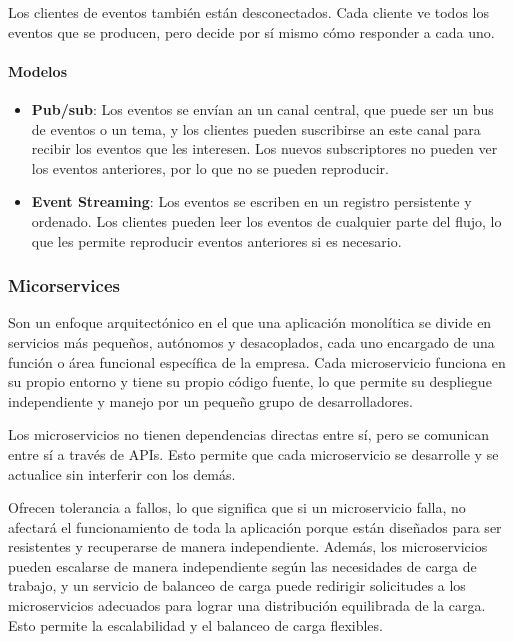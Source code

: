 \documentclass{article}
\begin{document}
		Los clientes de eventos también están desconectados. Cada cliente ve todos los eventos que se producen, pero decide por sí mismo cómo responder a cada uno.
		
		\paragraph{Modelos}
		\begin{itemize}
			\item {\textbf{Pub/sub}}: Los eventos se envían an un canal central, que puede ser un bus de eventos o un tema, y los clientes pueden suscribirse an este canal para recibir los eventos que les interesen. Los nuevos subscriptores no pueden ver los eventos anteriores, por lo que no se pueden reproducir. 
			\item {\textbf{Event Streaming}}: Los eventos se escriben en un registro persistente y ordenado. Los clientes pueden leer los eventos de cualquier parte del flujo, lo que les permite reproducir eventos anteriores si es necesario.
		\end{itemize}
		
		
		\subsubsection{Micorservices}
		Son un enfoque arquitectónico en el que una aplicación monolítica se divide en servicios más pequeños, autónomos y desacoplados, cada uno encargado de una función o área funcional específica de la empresa. Cada microservicio funciona en su propio entorno y tiene su propio código fuente, lo que permite su despliegue independiente y manejo por un pequeño grupo de desarrolladores.
		
		Los microservicios no tienen dependencias directas entre sí, pero se comunican entre sí a través de APIs. Esto permite que cada microservicio se desarrolle y se actualice sin interferir con los demás.
		
		Ofrecen tolerancia a fallos, lo que significa que si un microservicio falla, no afectará el funcionamiento de toda la aplicación porque están diseñados para ser resistentes y recuperarse de manera independiente. Además, los microservicios pueden escalarse de manera independiente según las necesidades de carga de trabajo, y un servicio de balanceo de carga puede redirigir solicitudes a los microservicios adecuados para lograr una distribución equilibrada de la carga. Esto permite la escalabilidad y el balanceo de carga flexibles. 
		
\end{document}
